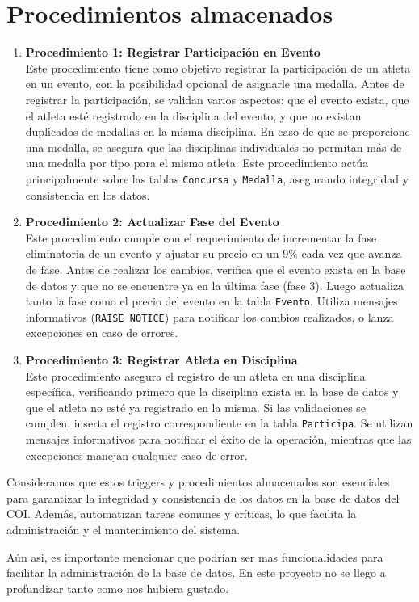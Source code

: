 \section{Procedimientos almacenados}
\begin{enumerate}
    \item \textbf{Procedimiento 1: Registrar Participación en Evento}\\
    Este procedimiento tiene como objetivo registrar la participación de un atleta en un evento, con la posibilidad opcional de asignarle una medalla. Antes de registrar la participación, se validan varios aspectos: que el evento exista, que el atleta esté registrado en la disciplina del evento, y que no existan duplicados de medallas en la misma disciplina. En caso de que se proporcione una medalla, se asegura que las disciplinas individuales no permitan más de una medalla por tipo para el mismo atleta. Este procedimiento actúa principalmente sobre las tablas \texttt{Concursa} y \texttt{Medalla}, asegurando integridad y consistencia en los datos.\vspace{0.5cm}

    \item \textbf{Procedimiento 2: Actualizar Fase del Evento}\\
    Este procedimiento cumple con el requerimiento de incrementar la fase eliminatoria de un evento y ajustar su precio en un 9\% cada vez que avanza de fase. Antes de realizar los cambios, verifica que el evento exista en la base de datos y que no se encuentre ya en la última fase (fase 3). Luego actualiza tanto la fase como el precio del evento en la tabla \texttt{Evento}. Utiliza mensajes informativos (\texttt{RAISE NOTICE}) para notificar los cambios realizados, o lanza excepciones en caso de errores.\vspace{0.5cm}

    \item \textbf{Procedimiento 3: Registrar Atleta en Disciplina}\\
    Este procedimiento asegura el registro de un atleta en una disciplina específica, verificando primero que la disciplina exista en la base de datos y que el atleta no esté ya registrado en la misma. Si las validaciones se cumplen, inserta el registro correspondiente en la tabla \texttt{Participa}. Se utilizan mensajes informativos para notificar el éxito de la operación, mientras que las excepciones manejan cualquier caso de error.\vspace{0.5cm}
\end{enumerate}

Consideramos que estos triggers y procedimientos almacenados son esenciales para garantizar la integridad y consistencia de los datos en la base de datos del COI. Además, automatizan tareas comunes y críticas, lo que facilita la administración y el mantenimiento del sistema.\vspace{0.5cm}

Aún asi, es importante mencionar que podrían ser mas funcionalidades para facilitar la administración de la base de datos. En este proyecto no se llego a profundizar tanto como nos hubiera gustado.